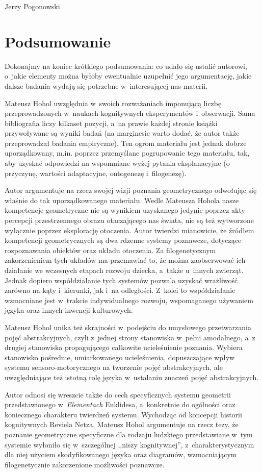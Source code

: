 \begin{newrevplenv}{Jerzy Pogonowski}
\section{Podsumowanie}

Dokonajmy na koniec krótkiego podsumowania: co udało się ustalić
autorowi, o~jakie elementy można byłoby ewentualnie uzupełnić jego
argumentację, jakie dalsze badania wydają się potrzebne w~interesującej nas materii.

Mateusz Hohol uwzględnia w~swoich rozważaniach imponującą liczbę
przeprowadzonych w~naukach kognitywnych eksperymentów i~obserwacji. Sama bibliografia liczy kilkaset pozycji, a~na prawie
każdej stronie książki przywoływane są wyniki badań (na marginesie
warto dodać, że autor także przeprowadzał badania empiryczne). Ten
ogrom materiału jest jednak dobrze uporządkowany, m.in. poprzez
przemyślane pogrupowanie tego materiału, tak, aby uzyskać
odpowiedzi na wspomniane wyżej pytania eksplanacyjne (o przyczynę,
wartości adaptacyjne, ontogenezę i~filogenezę).

Autor argumentuje na rzecz swojej wizji poznania geometrycznego
odwołując się właśnie do tak uporządkowanego materiału. Wedle
Mateusza Hohola nasze kompetencje geometryczne nie są wynikiem
uzyskanego jedynie poprzez akty percepcji przestrzennego obrazu
otaczającego nas świata, nie są też wytworzone wyłącznie poprzez
eksplorację otoczenia. Autor twierdzi mianowicie, że źródłem
kompetencji geometrycznych są dwa rdzenne systemy poznawcze,
dotyczące rozpoznawania obiektów oraz układu otoczenia. Za
filogenetycznym zakorzenieniem tych układów ma przemawiać to, że
można zaobserwować ich działanie we wczesnych etapach rozwoju
dziecka, a~także u~innych zwierząt. Jednak dopiero współdziałanie
tych systemów pozwala uzyskać wrażliwość zarówno na kąty i~kierunki, jak i~na odległości. Z~kolei to współdziałanie
wzmacniane jest w~trakcie indywidualnego rozwoju, wspomaganego
używaniem języka oraz innych inwencji kulturowych.

Mateusz Hohol unika też skrajności w~podejściu do umysłowego
przetwarzania pojęć abstrakcyjnych, czyli z~jednej strony
stanowiska w~pełni amodalnego, a~z drugiej stanowiska
propagującego całkowite ucieleśnienie poznania. Wybiera stanowisko
pośrednie, umiarkowanego ucieleśnienia, dopuszczające wpływ
systemu sensoro-motorycznego na tworzenie pojęć abstrakcyjnych,
ale uwzględniające też istotną rolę języka w~ustalaniu znaczeń
pojęć abstrakcyjnych.

Autor odnosi się wreszcie także do cech specyficznych systemu
geometrii przedstawionego w~{\em Elementach} Euklidesa, a~konkretnie do ogólności oraz koniecznego charakteru twierdzeń
systemu. Wychodząc od koncepcji historii kognitywnych Reviela
Netza, Mateusz Hohol argumentuje na rzecz tezy, że poznanie
geometryczne specyficzne dla rodzaju ludzkiego przedstawiane w~tym
systemie wyłoniło się w~szczególnej ,,niszy kognitywnej'', z~charakterystycznym dla niej użyciem skodyfikowanego języka oraz
diagramów, wzmacniającym filogenetycznie zakorzenione możliwości
poznawcze.


\end{newrevplenv}
